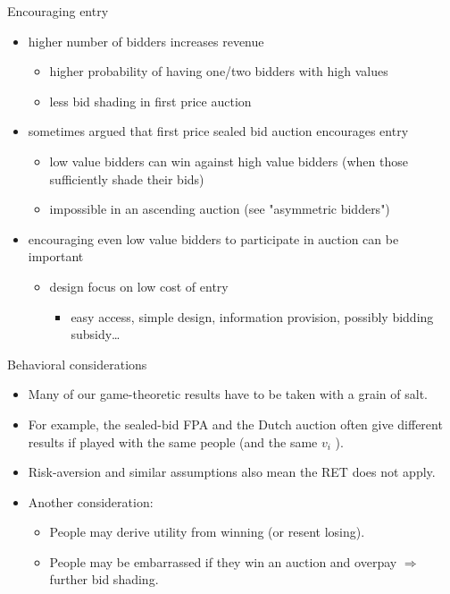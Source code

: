 \documentclass[bigger]{beamer}
\newcommand{\Ra}{\Rightarrow} \newcommand{\ra}{\rightarrow} \newcommand{\Lra}{\Leftrightarrow}
\begin{document}
\begin{frame}[label={sec:orgd11c170}]{Encouraging entry}
\begin{itemize}
\item higher number of bidders increases revenue
\begin{itemize}
\item higher probability of having one/two bidders with high values
\item less bid shading in first price auction
\end{itemize}
\item sometimes argued that first price sealed bid auction encourages entry
\begin{itemize}
\item low value bidders can win against high value bidders (when those sufficiently shade their bids)
\item impossible in an ascending auction (see "asymmetric bidders")
\end{itemize}
\item encouraging even low value bidders to participate in auction can be important
\begin{itemize}
\item design focus on low cost of entry
\begin{itemize}
\item easy access, simple design, information provision, possibly bidding subsidy\ldots{}
\end{itemize}
\end{itemize}
\end{itemize}
\end{frame}
\begin{frame}[label={sec:orgc8db019}]{Behavioral considerations}
\begin{itemize}
\item Many of our game-theoretic results have to be taken with a grain of salt.
\item For example, the sealed-bid FPA and the Dutch auction often give different results if played with the same people (and the same \(v_i\) ).
\item Risk-aversion and similar assumptions also mean the RET does not apply.
\item Another consideration:
\begin{itemize}
\item People may derive utility from winning (or resent losing).
\item People may be embarrassed if they win an auction and overpay \(\Ra\) further bid shading.
\end{itemize}
\end{itemize}
\end{frame}
\end{document}
